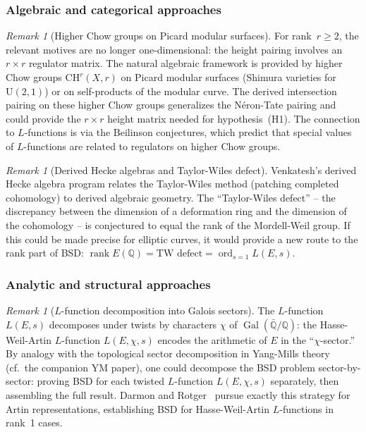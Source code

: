 \documentclass[aps,prd,twocolumn,superscriptaddress,nofootinbib]{revtex4-2}
\theoremstyle{definition}
\theoremstyle{remark}
\newtheorem{remark}[theorem]{Remark}
\DeclareMathOperator{\ord}{ord}
\DeclareMathOperator{\rank}{rank}
\DeclareMathOperator{\Gal}{Gal}
\begin{document}
\subsubsection{Algebraic and categorical approaches}

\begin{remark}[Higher Chow groups on Picard modular surfaces]
\label{rem:chow-groups}
For rank~$r \geq 2$, the relevant motives are no longer one-dimensional: the height pairing involves an $r \times r$ regulator matrix. The natural algebraic framework is provided by higher Chow groups $\mathrm{CH}^r(X, r)$ on Picard modular surfaces (Shimura varieties for $\mathrm{U}(2,1)$) or on self-products of the modular curve. The derived intersection pairing on these higher Chow groups generalizes the N\'eron-Tate pairing and could provide the $r \times r$ height matrix needed for hypothesis~(H1). The connection to $L$-functions is via the Beilinson conjectures, which predict that special values of $L$-functions are related to regulators on higher Chow groups.
\end{remark}

\begin{remark}[Derived Hecke algebras and Taylor-Wiles defect]
\label{rem:derived-hecke}
Venkatesh's derived Hecke algebra program relates the Taylor-Wiles method (patching completed cohomology) to derived algebraic geometry. The ``Taylor-Wiles defect'' -- the discrepancy between the dimension of a deformation ring and the dimension of the cohomology -- is conjectured to equal the rank of the Mordell-Weil group. If this could be made precise for elliptic curves, it would provide a new route to the rank part of BSD: $\rank E(\mathbb{Q}) = \text{TW defect} = \ord_{s=1} L(E,s)$.
\end{remark}

\subsubsection{Analytic and structural approaches}

\begin{remark}[$L$-function decomposition into Galois sectors]
\label{rem:galois-sectors}
The $L$-function $L(E,s)$ decomposes under twists by characters $\chi$ of $\Gal(\bar{\mathbb{Q}}/\mathbb{Q})$: the Hasse-Weil-Artin $L$-function $L(E, \chi, s)$ encodes the arithmetic of $E$ in the ``$\chi$-sector.'' By analogy with the topological sector decomposition in Yang-Mills theory (cf.\ the companion YM paper), one could decompose the BSD problem sector-by-sector: proving BSD for each twisted $L$-function $L(E, \chi, s)$ separately, then assembling the full result. Darmon and Rotger~\cite{DarmonRotger2017} pursue exactly this strategy for Artin representations, establishing BSD for Hasse-Weil-Artin $L$-functions in rank~1 cases.
\end{remark}
\end{document}
